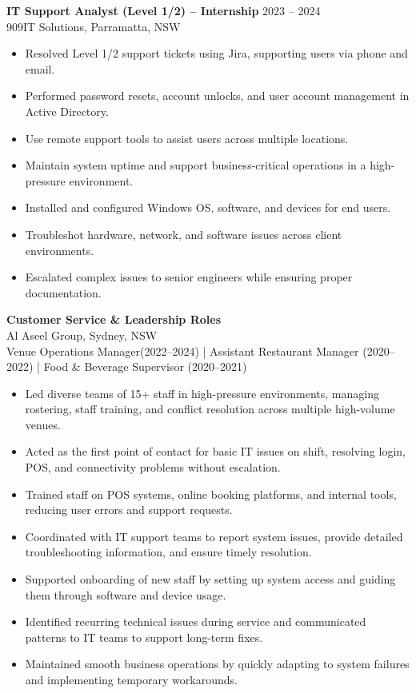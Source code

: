 \documentclass[letterpaper,10pt]{article}
\begin{document}
\textbf{IT Support Analyst (Level 1/2) – Internship} \hfill 2023 -- 2024 \\
909IT Solutions, Parramatta, NSW
\begin{itemize}
  \item Resolved Level 1/2 support tickets using Jira, supporting users via phone and email.
  \item Performed password resets, account unlocks, and user account management in Active Directory.
    \item Use remote support tools to assist users across multiple locations.
  \item Maintain system uptime and support business-critical operations in a high-pressure environment.
  \item Installed and configured Windows OS, software, and devices for end users.
  \item Troubleshot hardware, network, and software issues across client environments.
  \item Escalated complex issues to senior engineers while ensuring proper documentation.
\end{itemize}

\vspace{6pt}

\textbf{Customer Service \& Leadership Roles} \\
Al Aseel Group, Sydney, NSW \\
Venue Operations Manager(2022--2024) | Assistant Restaurant Manager (2020--2022) | Food \& Beverage Supervisor (2020--2021) 
 \begin{itemize} \item Led diverse teams of 15+ staff in high-pressure environments, managing rostering, staff training, and conflict resolution across multiple high-volume venues. 
 \item Acted as the first point of contact for basic IT issues on shift, resolving login, POS, and connectivity problems without escalation.
\item Trained staff on POS systems, online booking platforms, and internal tools, reducing user errors and support requests.
\item Coordinated with IT support teams to report system issues, provide detailed troubleshooting information, and ensure timely resolution.
\item Supported onboarding of new staff by setting up system access and guiding them through software and device usage.
\item Identified recurring technical issues during service and communicated patterns to IT teams to support long-term fixes.
\item Maintained smooth business operations by quickly adapting to system failures and implementing temporary workarounds.
 \end{itemize}
\end{document}

